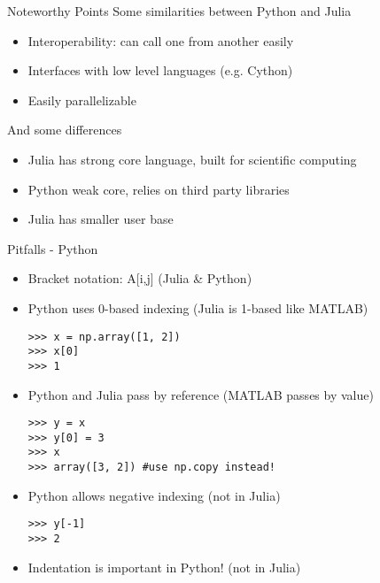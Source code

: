 \documentclass[11pt,t]{beamer}
\begin{document}
\begin{frame}[fragile]{Noteworthy Points}
Some similarities between Python and Julia
	\begin{itemize}
	\vspace{0.2cm}
	\item Interoperability: can call one from another easily
	\item Interfaces with low level languages (e.g. Cython)
	\item Easily parallelizable
		\end{itemize}
		\vspace{10mm}
		And some differences
			\begin{itemize}
			\vspace{0.2cm}
	\item Julia has strong core language, built for scientific computing
	\item Python weak core, relies on third party libraries
    \item Julia has smaller user base
		\end{itemize}
\end{frame}
\begin{frame}[fragile]{Pitfalls - Python}
	\begin{itemize}
	\item Bracket notation: A[i,j] (Julia \& Python)
	\item Python uses 0-based indexing (Julia is 1-based like MATLAB)
	\scriptsize
	\begin{lstlisting}
>>> x = np.array([1, 2])
>>> x[0] 
>>> 1
\end{lstlisting}
\normalsize
		\item {Python and Julia pass by reference (MATLAB passes by value)}
		\scriptsize
\begin{lstlisting}
>>> y = x
>>> y[0] = 3
>>> x 
>>> array([3, 2]) #use np.copy instead!
\end{lstlisting}
\normalsize
	\item Python allows negative indexing (not in Julia)
		\scriptsize
\begin{lstlisting}
>>> y[-1]
>>> 2
\end{lstlisting}	
\normalsize
\item Indentation is important in Python! (not in Julia)
		\end{itemize}
\end{frame}
\end{document}
